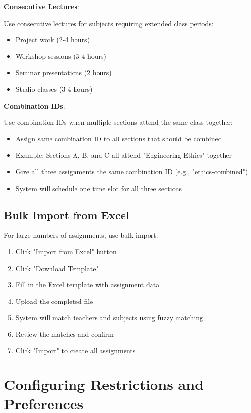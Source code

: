 \documentclass[12pt,a4paper]{article}
\begin{document}
\textbf{Consecutive Lectures}:

Use consecutive lectures for subjects requiring extended class periods:
\begin{itemize}
\item Project work (2-4 hours)
\item Workshop sessions (3-4 hours)
\item Seminar presentations (2 hours)
\item Studio classes (3-4 hours)
\end{itemize}

\textbf{Combination IDs}:

Use combination IDs when multiple sections attend the same class together:
\begin{itemize}
\item Assign same combination ID to all sections that should be combined
\item Example: Sections A, B, and C all attend "Engineering Ethics" together
\item Give all three assignments the same combination ID (e.g., "ethics-combined")
\item System will schedule one time slot for all three sections
\end{itemize}

\subsection{Bulk Import from Excel}

For large numbers of assignments, use bulk import:

\begin{enumerate}
\item Click "Import from Excel" button
\item Click "Download Template"
\item Fill in the Excel template with assignment data
\item Upload the completed file
\item System will match teachers and subjects using fuzzy matching
\item Review the matches and confirm
\item Click "Import" to create all assignments
\end{enumerate}


\section{Configuring Restrictions and Preferences}
\end{document}
